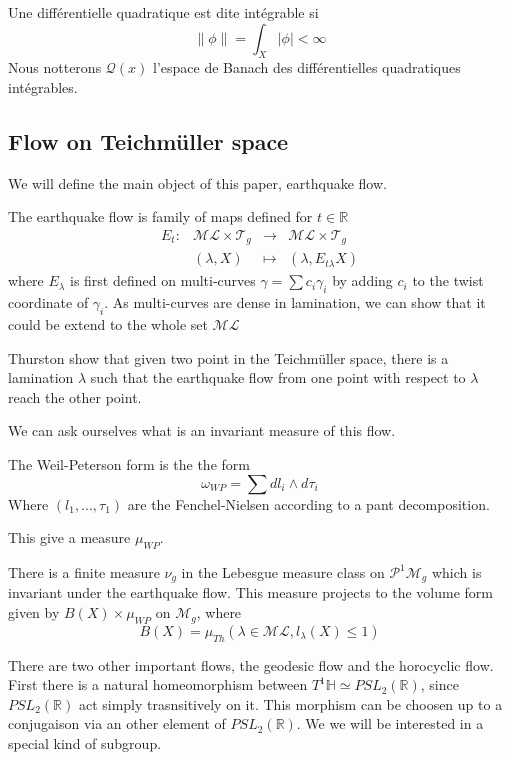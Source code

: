 Une différentielle quadratique est dite intégrable si \[
 \| \phi \| = \int_X | \phi | < \infty
\]
Nous notterons $\mathcal{Q}(x)$ l'espace de Banach des différentielles quadratiques intégrables.

\subsection{Flow on Teichmüller space}

We will define the main object of this paper, earthquake flow.

\begin{dfnt}
The earthquake flow is family of maps defined for $t \in \mathbb{R}$
\[
\begin{array}{crcl}

E_t: & \mathcal{ML}\times \mathcal{T}_g & \to & \mathcal{ML}\times \mathcal{T}_g \\

& (\lambda,X) & \mapsto & (\lambda,E_{t\lambda}X)

\end{array}
\]
where $E_\lambda$ is first defined on multi-curves $\gamma =\sum c_i \gamma_i$ by adding $c_i$ to the twist coordinate of $\gamma_i$.
As multi-curves are dense in lamination, we can show that it could be extend to the whole set $\mathcal{ML}$
\end{dfnt}

Thurston show that given two point in the Teichmüller space, there is a lamination $\lambda$ such that the earthquake flow from one point with respect to $\lambda$ reach the other point.

We can ask ourselves what is an invariant measure of this flow.

\begin{dfnt}
The Weil-Peterson form is the the form \[
\omega_{WP} = \sum d l_i \wedge d \tau_i
\]
Where $(l_1,...,\tau_1)$ are the Fenchel-Nielsen according to a pant decomposition.

This give a measure $\mu_{WP}$.
\end{dfnt}

There is a finite measure $\nu_g$ in the Lebesgue measure class on $\mathcal{P}^1 \mathcal{M}_g$ which is invariant under the earthquake flow. This measure projects to the volume form given by $B(X) \times \mu_{WP}$ on $\mathcal{M}_g$, where \[
B(X)=\mu_{Th}(\lambda \in \mathcal{ML}, l_\lambda(X) \leq 1)
\]

There are two other important flows, the geodesic flow and the horocyclic flow.
First there is a natural homeomorphism between $T^1 \mathbb{H}  \simeq PSL_2(\mathbb{R})$, since $PSL_2(\mathbb{R})$ act simply trasnsitively on it. This morphism can be choosen up to a conjugaison via an other element of $PSL_2(\mathbb{R})$. We we will be interested in a special kind of subgroup.

